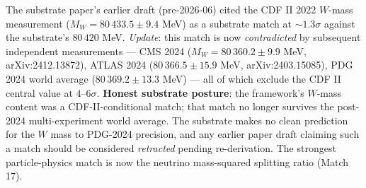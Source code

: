 \documentclass[11pt,a4paper]{amsart}
\theoremstyle{plain}
\theoremstyle{definition}
\begin{document}
\begin{description}[font=\normalfont\bfseries,leftmargin=2em,itemsep=6pt]
\item[Honest reframing --- CDF II $W$-boson mass anomaly.]
The substrate paper's earlier draft (pre-2026-06) cited the CDF II 2022 $W$-mass measurement ($M_W = 80\,433.5 \pm 9.4$ MeV) as a substrate match at $\sim 1.3\sigma$ against the substrate's $80\,420$ MeV. \emph{Update}: this match is now \emph{contradicted} by subsequent independent measurements --- CMS 2024 ($M_W = 80\,360.2 \pm 9.9$ MeV, arXiv:2412.13872), ATLAS 2024 ($80\,366.5 \pm 15.9$ MeV, arXiv:2403.15085), PDG 2024 world average ($80\,369.2 \pm 13.3$ MeV) --- all of which exclude the CDF II central value at $4$--$6\sigma$. \textbf{Honest substrate posture}: the framework's $W$-mass content was a CDF-II-conditional match; that match no longer survives the post-2024 multi-experiment world average. The substrate makes no clean prediction for the $W$ mass to PDG-2024 precision, and any earlier paper draft claiming such a match should be considered \emph{retracted} pending re-derivation. The strongest particle-physics match is now the neutrino mass-squared splitting ratio (Match 17).

\end{description}
\end{document}

